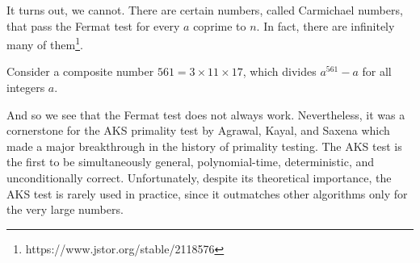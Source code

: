 \documentclass[../main.tex]{subfiles}
\begin{document}
It turns out, we cannot. There are certain numbers, called Carmichael numbers, that pass the Fermat test for every $a$ coprime to $n$. In fact, there are infinitely many of them\footnote{https://www.jstor.org/stable/2118576}.

\begin{tcolorbox}[title=Example]
    Consider a composite number $561 = 3 \times 11 \times 17$, which divides $a^{561} - a$ for all integers $a$.
\end{tcolorbox}

And so we see that the Fermat test does not always work. Nevertheless, it was a cornerstone for the AKS primality test by Agrawal, Kayal, and Saxena which made a major breakthrough in the history of primality testing. The AKS test is the first to be simultaneously general, polynomial-time, deterministic, and unconditionally correct. Unfortunately, despite its theoretical importance, the AKS test is rarely used in practice, since it outmatches other algorithms only for the very large numbers.
\end{document}

